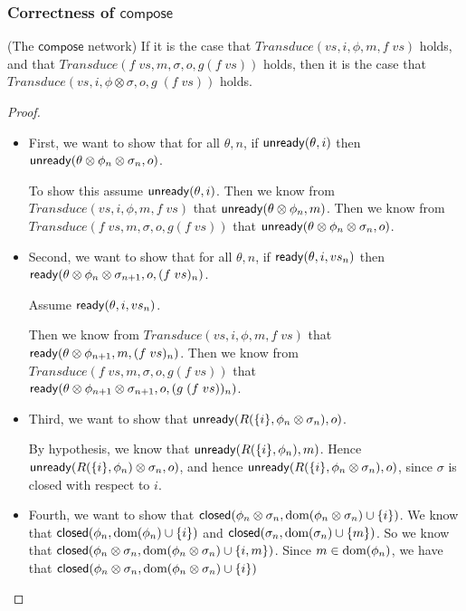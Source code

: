 \subsubsection{Correctness of $\mathsf{compose}$}

\begin{lemma}{(The $\mathsf{compose}$ network)}
If it is the case that $\mathit{Transduce}(vs, i, \phi, m, f\;vs)$ holds, and that
$\mathit{Transduce}(f\;vs, m, \sigma, o, g(f\;vs))$ holds, then it is the case that
$\mathit{Transduce}(vs, i, \phi \otimes \sigma, o, g\;(f\;vs))$ holds.
\end{lemma}

\begin{proof}
\begin{itemize}
\item First, we want to show that for all $\theta, n$, if $\mathsf{unready}({\theta}, {i})$ then $\mathsf{unready}({\theta \otimes \phi_n \otimes \sigma_n}, {o})$. 

  To show this assume $\mathsf{unready}({\theta}, {i})$. Then we know from $\mathit{Transduce}(vs, i, \phi, m, f\;vs)$
  that $\mathsf{unready}({\theta \otimes \phi_n}, {m})$. Then we know from $\mathit{Transduce}(f\;vs, m, \sigma, o, g(f\;vs))$
  that $\mathsf{unready}({\theta \otimes \phi_n \otimes \sigma_n}, {o})$. 

\item Second, we want to show that for all $\theta, n$, if
  $\mathsf{ready}({\theta}, {i}, {vs_n})$ then $\mathsf{ready}({\theta \otimes \phi_n \otimes
  \sigma_{n+1}}, {o}, {(f\;vs)_n})$.

  Assume $\mathsf{ready}({\theta}, {i}, {vs_n})$. 

  Then we know from $\mathit{Transduce}(vs, i, \phi, m, f\;vs)$ that
  $\mathsf{ready}({\theta \otimes \phi_{n+1}}, {m}, {(f\;vs)_n})$. Then we know from
  $\mathit{Transduce}(f\;vs, m, \sigma, o, g(f\;vs))$ that
  $\mathsf{ready}({\theta \otimes \phi_{n+1} \otimes
    \sigma_{n+1}}, {o}, {(g\;(f\;vs))_n})$.

\item Third, we want to show that $\mathsf{unready}({R(\{{i}\}, \phi_n \otimes \sigma_n)}, {o})$. 

  By hypothesis, we know that $\mathsf{unready}({R(\{{i}\},
    \phi_n)}, {m})$. Hence $\mathsf{unready}({R(\{{i}\}, \phi_n) \otimes
    \sigma_n}, {o})$, and hence $\mathsf{unready}({R(\{{i}\}, \phi_n \otimes
    \sigma_n)}, {o})$, since $\sigma$ is closed with respect to $i$. 

\item Fourth, we want to show that $\mathsf{closed}({\phi_n \otimes \sigma_n}, {\mbox{dom}({\phi_n \otimes \sigma_n}) \cup \{{i}\}})$. We know that  $\mathsf{closed}({\phi_n}, {\mbox{dom}({\phi_n}) \cup \{{i}\}})$ and 
$\mathsf{closed}({\sigma_n}, {\mbox{dom}({\sigma_n}) \cup \{{m}\}})$. So we know that $\mathsf{closed}({\phi_n \otimes \sigma_n}, {\mbox{dom}({\phi_n \otimes \sigma_n}) \cup \{{i,m}\}})$. Since $m \in \mbox{dom}({\phi_n})$, we have that
$\mathsf{closed}({\phi_n \otimes \sigma_n}, {\mbox{dom}({\phi_n \otimes \sigma_n}) \cup \{{i}\}})$


\end{itemize}
\end{proof}
